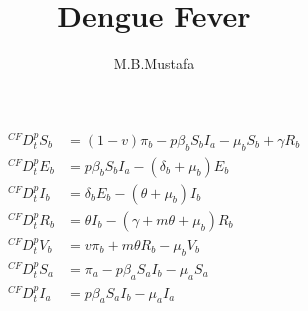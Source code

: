 \documentclass{article}
\title{Dengue Fever}
\author{M.B.Mustafa}
\theoremstyle{mytheoremstyle}
\theoremstyle{mytheoremstyle}
\theoremstyle{myproblemstyle}
\begin{document}
    \maketitle
    $$
    \begin{aligned}
    { }^{C F} D_t^p S_b & =(1-v) \pi_b-p \beta_b S_b I_a-\mu_b S_b+\gamma R_b \\
    { }^{C F} D_t^p E_b & =p \beta_b S_b I_a-\left(\delta_b+\mu_b\right) E_b \\
    { }^{C F} D_t^p I_b & =\delta_b E_b-\left(\theta+\mu_b\right) I_b \\
    { }^{C F} D_t^p R_b & =\theta I_b-\left(\gamma+m \theta+\mu_b\right) R_b \\
    { }^{C F} D_t^p V_b & =v \pi_b+m \theta R_b-\mu_b V_b \\
    { }^{C F} D_t^p S_a & =\pi_a-p \beta_a S_a I_b-\mu_a S_a \\
    { }^{C F} D_t^p I_a & =p \beta_a S_a I_b-\mu_a I_a
    \end{aligned}
    $$  
\end{document}
